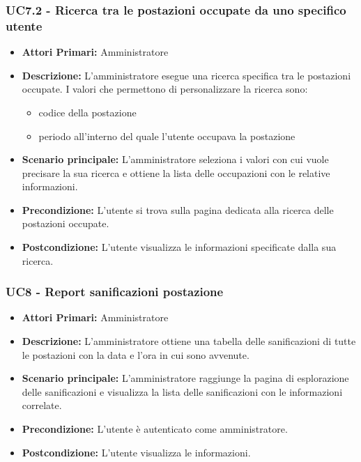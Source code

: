 \subsubsection{ UC7.2 - Ricerca tra le postazioni occupate da uno specifico utente}
\begin{itemize}
	\item\textbf{Attori Primari:} 
	Amministratore
	\item\textbf{Descrizione:} 
	L'amministratore esegue una ricerca specifica tra le postazioni occupate.
	I valori che permettono di personalizzare la ricerca sono:
	\begin{itemize}
		\item codice della postazione
		\item periodo all'interno del quale l'utente occupava la postazione
	\end{itemize}
	\item\textbf{Scenario principale:} 
	L'amministratore seleziona i valori con cui vuole precisare la sua ricerca e ottiene la lista delle occupazioni con le relative informazioni.
	\item\textbf{Precondizione:} 
	L'utente si trova sulla pagina dedicata alla ricerca delle postazioni occupate.
	\item\textbf{Postcondizione:}
	L'utente visualizza le informazioni specificate dalla sua ricerca.
\end{itemize}

\subsubsection{ UC8 - Report sanificazioni postazione}
\begin{itemize}
           	\item\textbf{Attori Primari:} 
           	Amministratore
           	\item\textbf{Descrizione:} 
           	L'amministratore ottiene una tabella delle sanificazioni di tutte le postazioni con la data e l'ora in cui sono avvenute.
           	\item\textbf{Scenario principale:} 
           	L'amministratore raggiunge la pagina di esplorazione delle sanificazioni e visualizza la lista delle sanificazioni con le informazioni correlate.
           	\item\textbf{Precondizione:} 
           	L'utente è autenticato come amministratore.
           	\item\textbf{Postcondizione:}
           	L'utente visualizza le informazioni.
\end{itemize}

